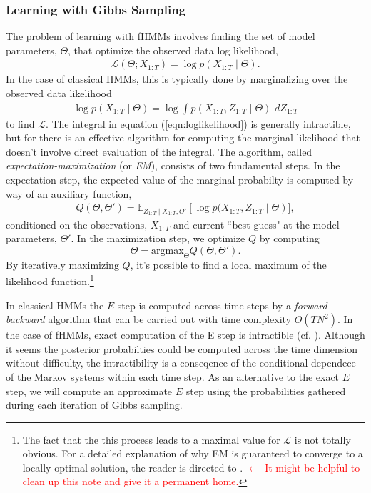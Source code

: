 \documentclass{amsart}
\begin{document}
\subsubsection{Learning with Gibbs Sampling}
The problem of learning with fHMMs involves finding the set of model parameters, $\Theta$, that optimize the observed data log likelihood, 
\begin{eqnarray*}
\mathcal L(\Theta;X_{1:T}) = \log p(X_{1:T}\mid \Theta).
\end{eqnarray*}
In the case of classical HMMs, this is typically done by marginalizing over the observed data likelihood
\begin{eqnarray}\label{eqn:loglikelihood}
\log p(X_{1:T}\mid \Theta) = \log\int p(X_{1:T},Z_{1:T}\mid \Theta)\,\,dZ_{1:T}
\end{eqnarray}
to find $\mathcal L$.  The integral in equation (\ref{eqn:loglikelihood}) is generally intractible, but for there is an effective algorithm for computing the marginal likelihood that doesn't involve direct evaluation of the integral.  The algorithm, called {\em expectation-maximization} (or {\em EM}), consists of two fundamental steps.  In the expectation step, the expected value of the marginal probabilty is computed by way of an auxiliary function,
\begin{eqnarray}
Q(\Theta,\Theta') = \mathbb E_{Z_{1:T}\mid X_{1:T},\Theta'}\left[\log p(X_{1:T},Z_{1:T}\mid \Theta\right)],
\end{eqnarray}
conditioned on the observations, $X_{1:T}$ and current ``best guess" at the model parameters, $\Theta'$.  In the maximization step, we optimize $Q$ by computing 
\[
\Theta = \text{argmax}_{\Theta}Q(\Theta,\Theta').
\]
By iteratively maximizing $Q$, it's possible to find a local maximum of the likelihood function.\footnote{The fact that the this process leads to a maximal value for $\mathcal L$ is not totally obvious.  For a detailed explanation of why EM is guaranteed to converge to a locally optimal solution, the reader is directed to \cite[$\S2.2$]{HVB20}. \textcolor{red}{$\leftarrow$ It might be helpful to clean up this note and give it a permanent home.}}

In classical HMMs the $E$ step is computed across time steps by a {\em forward-backward} algorithm that can be carried out with time complexity $O(TN^2)$.  In the case of fHMMs, exact computation of the E step is intractible (cf. \cite[$\S3.3$]{GJ95}).  Although it seems the posterior probabilties could be computed across the time dimension without difficulty, the intractibility is a conseqence of the conditional dependece of the Markov systems within each time step.  As an alternative to the exact $E$ step, we will compute an approximate $E$ step using the probabilities gathered during each iteration of Gibbs sampling.  
\end{document}
